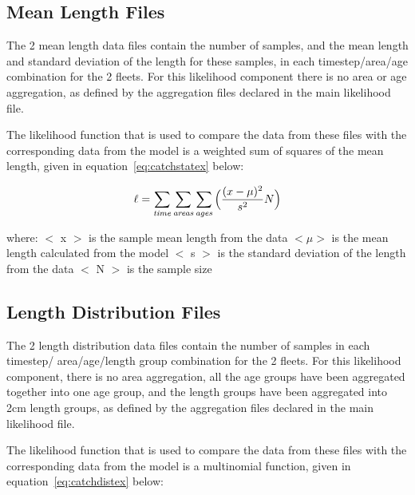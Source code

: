 \documentclass[10pt,twoside]{article}
\begin{document}
{\small }

\subsection{Mean Length Files}
The 2 mean length data files contain the number of samples, and the mean length and standard deviation of the length for these samples, in each timestep/area/age combination for the 2 fleets.  For this likelihood component there is no area or age aggregation, as defined by the aggregation files declared in the main likelihood file.

\bigskip
The likelihood function that is used to compare the data from these files with the corresponding data from the model is a weighted sum of squares of the mean length, given in equation~\ref{eq:catchstatex} below:

\begin{equation}\label{eq:catchstatex}
\ell = \sum_{\it time}\sum_{\it areas}\sum_{\it ages} \Big(\frac{(x-\mu)^2} {s^2} N\Big)
\end{equation}

where:\newline
$<$ x $>$ is the sample mean length from the data\newline
$<\mu>$ is the mean length calculated from the model\newline
$<$ s $>$ is the standard deviation of the length from the data\newline
$<$ N $>$ is the sample size

{\small }
{\small }

\subsection{Length Distribution Files}\label{sec:ldist}
The 2 length distribution data files contain the number of samples in each timestep/ area/age/length group combination for the 2 fleets.  For this likelihood component, there is no area aggregation, all the age groups have been aggregated together into one age group, and the length groups have been aggregated into 2cm length groups, as defined by the aggregation files declared in the main likelihood file.

\bigskip
The likelihood function that is used to compare the data from these files with the corresponding data from the model is a multinomial function, given in equation~\ref{eq:catchdistex} below:
\end{document}
